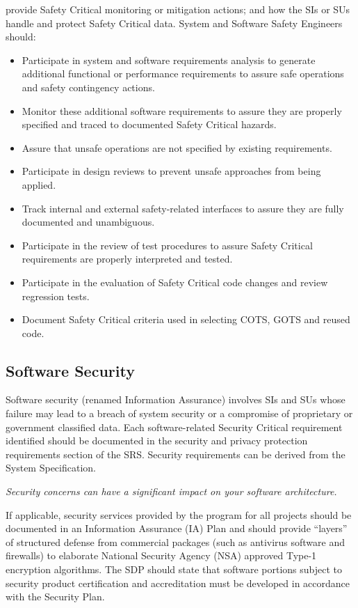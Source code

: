 provide Safety Critical monitoring or mitigation actions; and
how the SIs or SUs handle and protect Safety Critical data.
System and Software Safety Engineers should:

\begin{itemize}
	\renewcommand{\labelitemi}{\scriptsize$\blacksquare$}
	\item Participate in system and software requirements analysis to generate additional functional or performance
	requirements to assure safe operations and safety contingency actions.
	\item Monitor these additional software requirements to
	assure they are properly specified and traced to documented Safety Critical hazards.
	\item Assure that unsafe operations are not specified by existing requirements.
	\item Participate in design reviews to prevent unsafe
	approaches from being applied.
	\item Track internal and external safety-related interfaces to
	assure they are fully documented and unambiguous.
	\item Participate in the review of test procedures to assure Safety
	Critical requirements are properly interpreted and tested.
	\item Participate in the evaluation of Safety Critical code
	changes and review regression tests.
	\item Document Safety Critical criteria used in selecting
	COTS, GOTS and reused code.
\end{itemize}

\subsection{Software Security}
Software security (renamed Information Assurance) involves
SIs and SUs whose failure may lead to a breach of system
security or a compromise of proprietary or government classified data. Each software-related Security Critical requirement identified should be documented in the security and
privacy protection requirements section of the SRS. Security
requirements can be derived from the System Specification. 

\textit{Security concerns can have a significant impact on
your software architecture.}

If applicable, security services provided by the program
for all projects should be documented in an Information
Assurance (IA) Plan and should provide “layers” of structured defense from commercial packages (such as antivirus software and firewalls) to elaborate National Security
Agency (NSA) approved Type-1 encryption algorithms. The
SDP should state that software portions subject to security
product certification and accreditation must be developed in
accordance with the Security Plan.

